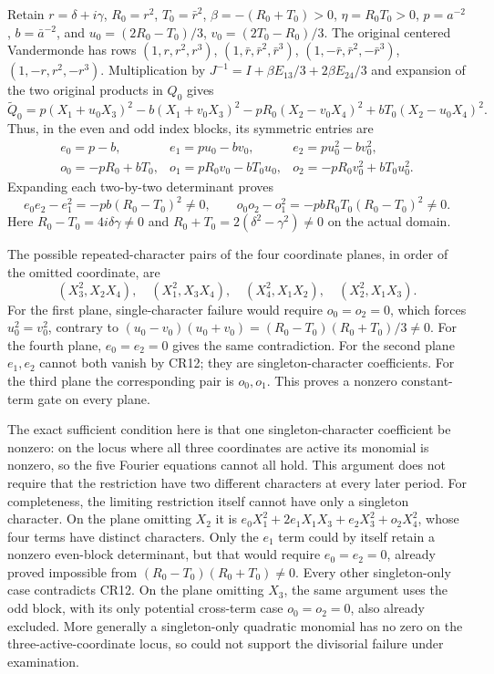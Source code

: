 \documentclass[11pt]{article}
\begin{document}
Retain $r=\delta+i\gamma$, $R_0=r^2$, $T_0=\bar r^2$,
$\beta=-(R_0+T_0)>0$, $\eta=R_0T_0>0$, $p=a^{-2}$,
$b=\bar a^{-2}$, and
$u_0=(2R_0-T_0)/3$, $v_0=(2T_0-R_0)/3$.
The original centered Vandermonde has rows
$(1,r,r^2,r^3)$, $(1,\bar r,\bar r^2,\bar r^3)$,
$(1,-\bar r,\bar r^2,-\bar r^3)$,
$(1,-r,r^2,-r^3)$.  Multiplication by
$J^{-1}=I+\beta E_{13}/3+2\beta E_{24}/3$ and expansion of the
two original products in $Q_0$ gives
\[
 \widetilde Q_0=p(X_1+u_0X_3)^2-b(X_1+v_0X_3)^2
      -pR_0(X_2-v_0X_4)^2+bT_0(X_2-u_0X_4)^2.                   \tag{CR10}
\]
Thus, in the even and odd index blocks, its symmetric entries are
\[
 \begin{array}{lll}
 e_0=p-b,&e_1=pu_0-bv_0,&e_2=pu_0^2-bv_0^2,\\
 o_0=-pR_0+bT_0,&o_1=pR_0v_0-bT_0u_0,
                    &o_2=-pR_0v_0^2+bT_0u_0^2.
 \end{array}                                                     \tag{CR11}
\]
Expanding each two-by-two determinant proves
\[
 e_0e_2-e_1^2=-pb(R_0-T_0)^2\ne0,\qquad
 o_0o_2-o_1^2=-pbR_0T_0(R_0-T_0)^2\ne0.                         \tag{CR12}
\]
Here $R_0-T_0=4i\delta\gamma\ne0$ and
$R_0+T_0=2(\delta^2-\gamma^2)\ne0$ on the actual domain.

The possible repeated-character pairs of the four coordinate
planes, in order of the omitted coordinate, are
\[
 (X_3^2,X_2X_4),\quad (X_1^2,X_3X_4),\quad
 (X_4^2,X_1X_2),\quad (X_2^2,X_1X_3).
\]
For the first plane, single-character failure would require
$o_0=o_2=0$, which forces $u_0^2=v_0^2$, contrary to
$(u_0-v_0)(u_0+v_0)=(R_0-T_0)(R_0+T_0)/3\ne0$.
For the fourth plane, $e_0=e_2=0$ gives the same contradiction.
For the second plane $e_1,e_2$ cannot both vanish by CR12; they
are singleton-character coefficients.  For the third plane the
corresponding pair is $o_0,o_1$.  This proves a nonzero
constant-term gate on every plane.

The exact sufficient condition here is that one singleton-character
coefficient be nonzero: on the locus where all three coordinates are
active its monomial is nonzero, so the five Fourier equations cannot
all hold.  This argument does not require that the restriction have
two different characters at every later period.  For completeness,
the limiting restriction itself cannot have only a singleton character.
On the plane omitting $X_2$ it is
$e_0X_1^2+2e_1X_1X_3+e_2X_3^2+o_2X_4^2$, whose four terms have
distinct characters.  Only the $e_1$ term could by itself retain a
nonzero even-block determinant, but that would require
$e_0=e_2=0$, already proved impossible from
$(R_0-T_0)(R_0+T_0)\ne0$.  Every other singleton-only case
contradicts CR12.  On the plane omitting $X_3$, the same argument
uses the odd block, with its only potential cross-term case
$o_0=o_2=0$, also already excluded.  More generally a singleton-only
quadratic monomial has no zero on the three-active-coordinate locus,
so could not support the divisorial failure under examination.
\end{document}

